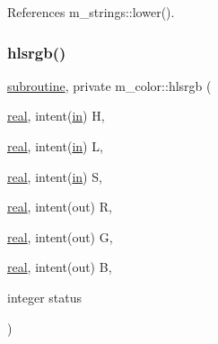 References m\+\_\+strings\+::lower().

\mbox{\label{namespacem__color_a40e6c91da216384eded2157cdaf86eba}} 
\subsubsection{\texorpdfstring{hlsrgb()}{hlsrgb()}}
{\footnotesize\ttfamily \hyperlink{M__stopwatch_83_8txt_acfbcff50169d691ff02d4a123ed70482}{subroutine}, private m\+\_\+color\+::hlsrgb (\begin{DoxyParamCaption}\item[{\hyperlink{read__watch_83_8txt_abdb62bde002f38ef75f810d3a905a823}{real}, intent(\hyperlink{M__journal_83_8txt_afce72651d1eed785a2132bee863b2f38}{in})}]{H,  }\item[{\hyperlink{read__watch_83_8txt_abdb62bde002f38ef75f810d3a905a823}{real}, intent(\hyperlink{M__journal_83_8txt_afce72651d1eed785a2132bee863b2f38}{in})}]{L,  }\item[{\hyperlink{read__watch_83_8txt_abdb62bde002f38ef75f810d3a905a823}{real}, intent(\hyperlink{M__journal_83_8txt_afce72651d1eed785a2132bee863b2f38}{in})}]{S,  }\item[{\hyperlink{read__watch_83_8txt_abdb62bde002f38ef75f810d3a905a823}{real}, intent(out)}]{R,  }\item[{\hyperlink{read__watch_83_8txt_abdb62bde002f38ef75f810d3a905a823}{real}, intent(out)}]{G,  }\item[{\hyperlink{read__watch_83_8txt_abdb62bde002f38ef75f810d3a905a823}{real}, intent(out)}]{B,  }\item[{integer}]{status }\end{DoxyParamCaption})\hspace{0.3cm}{\ttfamily [private]}}


